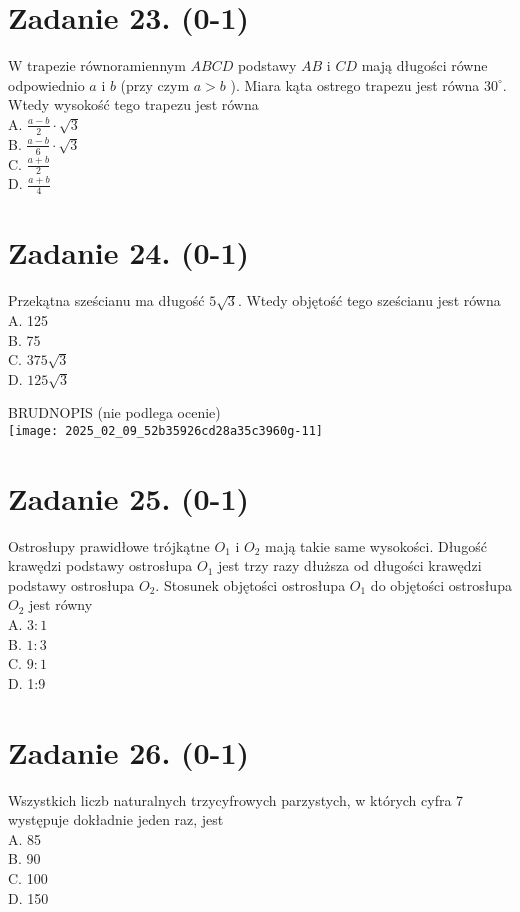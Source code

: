 \documentclass[10pt]{article}
\begin{document}
\section*{Zadanie 23. (0-1)}
W trapezie równoramiennym \(A B C D\) podstawy \(A B\) i \(C D\) mają długości równe odpowiednio \(a\) i \(b\) (przy czym \(a>b\) ). Miara kąta ostrego trapezu jest równa \(30^{\circ}\). Wtedy wysokość tego trapezu jest równa\\
A. \(\frac{a-b}{2} \cdot \sqrt{3}\)\\
B. \(\frac{a-b}{6} \cdot \sqrt{3}\)\\
C. \(\frac{a+b}{2}\)\\
D. \(\frac{a+b}{4}\)

\section*{Zadanie 24. (0-1)}
Przekątna sześcianu ma długość \(5 \sqrt{3}\). Wtedy objętość tego sześcianu jest równa\\
A. 125\\
B. 75\\
C. \(375 \sqrt{3}\)\\
D. \(125 \sqrt{3}\)

BRUDNOPIS (nie podlega ocenie)\\
\texttt{[image: 2025\_02\_09\_52b35926cd28a35c3960g-11]}

\section*{Zadanie 25. (0-1)}
Ostrosłupy prawidłowe trójkątne \(O_{1}\) i \(O_{2}\) mają takie same wysokości. Długość krawędzi podstawy ostrosłupa \(O_{1}\) jest trzy razy dłuższa od długości krawędzi podstawy ostrosłupa \(O_{2}\). Stosunek objętości ostrosłupa \(O_{1}\) do objętości ostrosłupa \(O_{2}\) jest równy\\
A. \(3: 1\)\\
B. \(1: 3\)\\
C. \(9: 1\)\\
D. 1:9

\section*{Zadanie 26. (0-1)}
Wszystkich liczb naturalnych trzycyfrowych parzystych, w których cyfra 7 występuje dokładnie jeden raz, jest\\
A. 85\\
B. 90\\
C. 100\\
D. 150
\end{document}
